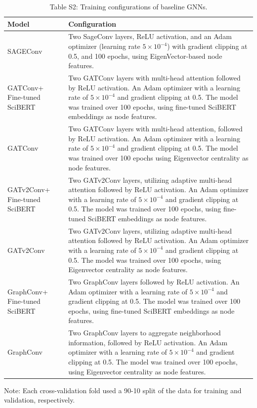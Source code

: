 \documentclass[journal,twoside,web]{ieeecolor}
\begin{document}
\begin{table}[h!]
\centering
\begin{threeparttable}
\caption*{Table S2: Training configurations of baseline GNNs.}
\label{tbl:cv_scores}
\begin{tabular}{@{\extracolsep\fill} p{} p{} @{\extracolsep\fill}}
\toprule
Model & Configuration \\
\midrule
SAGEConv & 
    Two SageConv layers, ReLU activation, and an Adam optimizer (learning rate \(5 \times 10^{-4}\)) with gradient clipping at 0.5, and 100 epochs, using EigenVector-based node features.
\\
GATConv+ Fine-tuned SciBERT &  
    Two GATConv layers with multi-head attention followed by ReLU activation. 
    An Adam optimizer with a learning rate of \(5 \times 10^{-4}\) and gradient clipping at 0.5.
    The model was trained over 100 epochs, using fine-tuned SciBERT embeddings as node features.
\\
GATConv & 
    Two GATConv layers with multi-head attention, followed by ReLU activation.
    An Adam optimizer with a learning rate of \(5 \times 10^{-4}\) and gradient clipping at 0.5. The model was trained over 100 epochs using Eigenvector centrality as node features.
\\
GATv2Conv+ Fine-tuned SciBERT &
    Two GATv2Conv layers, utilizing adaptive multi-head attention followed by ReLU activation. 
    An Adam optimizer with a learning rate of \(5 \times 10^{-4}\) and gradient clipping at 0.5.
    The model was trained over 100 epochs, using fine-tuned SciBERT embeddings as node features.
\\
GATv2Conv & 
    Two GATv2Conv layers, utilizing adaptive multi-head attention followed by ReLU activation. 
    An Adam optimizer with a learning rate of \(5 \times 10^{-4}\) and gradient clipping at 0.5. The model was trained over 100 epochs, using Eigenvector centrality as node features.
\\
GraphConv+ Fine-tuned SciBERT & 
    Two GraphConv layers followed by ReLU activation. 
    An Adam optimizer with a learning rate of \(5 \times 10^{-4}\) and gradient clipping at 0.5.
    The model was trained over 100 epochs, using fine-tuned SciBERT embeddings as node features.
\\
GraphConv &  
    Two GraphConv layers to aggregate neighborhood information, followed by ReLU activation. 
    An Adam optimizer with a learning rate of \(5 \times 10^{-4}\) and gradient clipping at 0.5.
    The model was trained over 100 epochs, using Eigenvector centrality as node features.
\\
\bottomrule
\end{tabular}
\begin{tablenotes}
\item Note: Each cross-validation fold used a 90-10 split of the data for training and validation, respectively.
\end{tablenotes}
\end{threeparttable}
\end{table}
\end{document}
